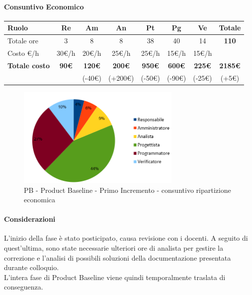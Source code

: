 \paragraph{Consuntivo Economico}
\begin{center}
	\renewcommand{\arraystretch}{1.8}
	\begin{tabular}{ |m{6em}|c|c|c|c|c|c|c| }
	\hline
	\textbf{Ruolo} & \textbf{Re} & \textbf{Am} &  \textbf{An} &  \textbf{Pt} &  \textbf{Pg} &  \textbf{Ve} &  \textbf{Totale}\\
    \hline
    Totale ore & 3 & 8 & 8 & 38 & 40 & 14 & \textbf{110}\\
    \hline
    Costo \euro/h & 30\euro/h & 20\euro/h & 25\euro/h & 25\euro/h & 15\euro/h & 15\euro/h & \\
    \hline
    \textbf{Totale costo} & \textbf{90\euro} & \textbf{120\euro} &  \textbf{200\euro} & \textbf{950\euro} &  \textbf{600\euro} &  \textbf{225\euro} &  \textbf{2185\euro} \\
    &  & (-40\euro) & (+200\euro) & (-50\euro) & (-90\euro) & (-25\euro) & (+5\euro) \\
    \hline
	\end{tabular}

    \begin{figure}[H]
        \centering\includegraphics[width=0.7\textwidth, height=0.7\textheight, keepaspectratio]{images/consuntivo/PB-costo.png}
        \caption{PB - Product Baseline - Primo Incremento - consuntivo ripartizione economica}
    \end{figure}
\end{center}

\paragraph{Considerazioni} \hfill \break
L'inizio della fase è stato posticipato, causa revisione con i docenti. A seguito di quest'ultima, 
sono state necessarie ulteriori ore di analista per gestire la correzione e l'analisi di possibili soluzioni della documentazione presentata durante colloquio.\\
L'intera fase di Product Baseline viene quindi temporalmente traslata di conseguenza.


